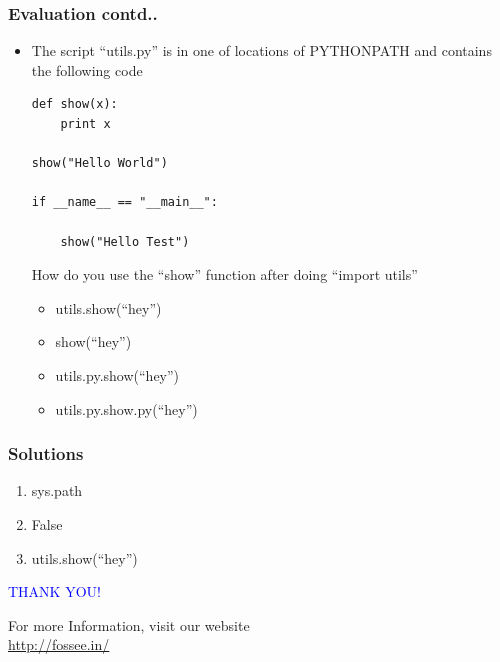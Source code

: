 \documentclass[presentation]{beamer}
\begin{document}
\begin{frame}[fragile]
\frametitle{Evaluation contd..}
\label{sec-8}


\begin{itemize}
\item The script ``utils.py'' is in one of locations of PYTHONPATH and contains
    the following code
\lstset{language=Python}
\begin{lstlisting}
def show(x):
    print x

show("Hello World")

if __name__ == "__main__":

    show("Hello Test")
\end{lstlisting}
  How do you use the ``show'' function after doing ``import utils''
\begin{itemize}
\item utils.show(``hey'')
\item show(``hey'')
\item utils.py.show(``hey'')
\item utils.py.show.py(``hey'')
\end{itemize}
\end{itemize}
\end{frame}
\begin{frame}
\frametitle{Solutions}
\label{sec-9}


\begin{enumerate}
\item sys.path
\vspace{12pt}
\item False
\vspace{12pt}
\item utils.show(``hey'')
\end{enumerate}
\end{frame}
\begin{frame}

  \begin{block}{}
  \begin{center}
  \textcolor{blue}{\Large THANK YOU!} 
  \end{center}
  \end{block}
\begin{block}{}
  \begin{center}
    For more Information, visit our website\\
    \url{http://fossee.in/}
  \end{center}  
  \end{block}
\end{frame}
\end{document}

